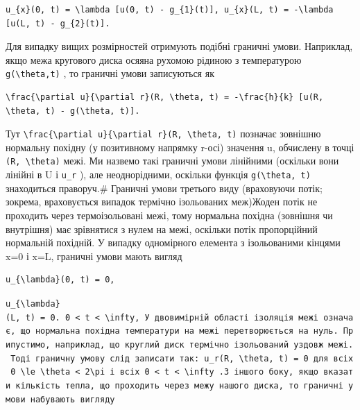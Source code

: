\documentclass[
  ukrainian,
]{article}
\begin{document}
\begin{verbatim}
u_{x}(0, t) = \lambda [u(0, t) - g_{1}(t)], u_{x}(L, t) = -\lambda [u(L, t) - g_{2}(t)].
\end{verbatim}

Для випадку вищих розмірностей отримують подібні граничні умови.
Наприклад, якщо межа кругового диска осяяна рухомою рідиною з
температурою \texttt{g(\textbackslash{}theta,t)} , то граничні умови
записуються як

\begin{verbatim}
\frac{\partial u}{\partial r}(R, \theta, t) = -\frac{h}{k} [u(R, \theta, t) - g(\theta, t)].
\end{verbatim}

Тут
\texttt{\textbackslash{}frac\{\textbackslash{}partial\ u\}\{\textbackslash{}partial\ r\}(R,\ \textbackslash{}theta,\ t)}
позначає зовнішню нормальну похідну (у позитивному напрямку r-осі)
значення u, обчислену в точці \texttt{(R,\ \textbackslash{}theta)} межі.
Ми назвемо такі граничні умови лінійними (оскільки вони лінійні в U і
\texttt{u\_r} ), але неоднорідними, оскільки функція
\texttt{g(\textbackslash{}theta,\ t)} знаходиться праворуч.\# Граничні
умови третього виду (враховуючи потік; зокрема, враховується випадок
термічно ізольованих меж)Жоден потік не проходить через термоізольовані
межі, тому нормальна похідна (зовнішня чи внутрішня) має зрівнятися з
нулем на межі, оскільки потік пропорційний нормальній похідній. У
випадку одномірного елемента з ізольованими кінцями x=0 і x=L, граничні
умови мають вигляд

\begin{verbatim}
u_{\lambda}(0, t) = 0,
\end{verbatim}

\texttt{\textquotesingle{}u\_\{\textbackslash{}lambda\}(L,\ t)\ =\ 0.\textquotesingle{}\ \textquotesingle{}0\ \textless{}\ t\ \textless{}\ \textbackslash{}infty,\textquotesingle{}\ У\ двовимірній\ області\ ізоляція\ межі\ означає,\ що\ нормальна\ похідна\ температури\ на\ межі\ перетворюється\ на\ нуль.\ Припустимо,\ наприклад,\ що\ круглий\ диск\ термічно\ ізольований\ уздовж\ межі.\ Тоді\ граничну\ умову\ слід\ записати\ так:\ \textquotesingle{}u\_r(R,\ \textbackslash{}theta,\ t)\ =\ 0\textquotesingle{}\ для\ всіх\ \textquotesingle{}0\ \textbackslash{}le\ \textbackslash{}theta\ \textless{}\ 2\textbackslash{}pi\textquotesingle{}\ і\ всіх\ \textquotesingle{}0\ \textless{}\ t\ \textless{}\ \textbackslash{}infty\textquotesingle{}\ .З\ іншого\ боку,\ якщо\ вказати\ кількість\ тепла,\ що\ проходить\ через\ межу\ нашого\ диска,\ то\ граничні\ умови\ набувають\ вигляду}
\end{document}
